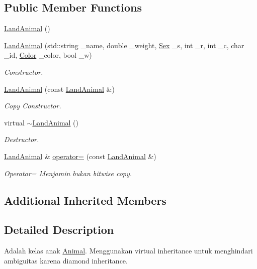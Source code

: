 \subsection*{Public Member Functions}
\begin{DoxyCompactItemize}
\item 
\hyperlink{classLandAnimal_a95def5df7e0a8fe05ba953da1a7736c1}{Land\+Animal} ()
\item 
\hyperlink{classLandAnimal_aff1be0d673a2431e45ab1130bc30411e}{Land\+Animal} (std\+::string \+\_\+name, double \+\_\+weight, \hyperlink{sex_8h_a2633cb393c68bb2ee8080db58fb7ba93}{Sex} \+\_\+s, int \+\_\+r, int \+\_\+c, char \+\_\+id, \hyperlink{color_8h_ab87bacfdad76e61b9412d7124be44c1c}{Color} \+\_\+color, bool \+\_\+w)
\begin{DoxyCompactList}\small\item\em Constructor. \end{DoxyCompactList}\item 
\hyperlink{classLandAnimal_a30d3d693ec1a1d7589a75e93c0efcef7}{Land\+Animal} (const \hyperlink{classLandAnimal}{Land\+Animal} \&)
\begin{DoxyCompactList}\small\item\em Copy Constructor. \end{DoxyCompactList}\item 
virtual \hyperlink{classLandAnimal_a074c3e48f60792ee5da0daf23feb8a13}{$\sim$\+Land\+Animal} ()
\begin{DoxyCompactList}\small\item\em Destructor. \end{DoxyCompactList}\item 
\hyperlink{classLandAnimal}{Land\+Animal} \& \hyperlink{classLandAnimal_a6ddc4597ce67878a051745cf6e14b351}{operator=} (const \hyperlink{classLandAnimal}{Land\+Animal} \&)
\begin{DoxyCompactList}\small\item\em Operator= Menjamin bukan bitwise copy. \end{DoxyCompactList}\end{DoxyCompactItemize}
\subsection*{Additional Inherited Members}


\subsection{Detailed Description}
Adalah kelas anak \hyperlink{classAnimal}{Animal}. Menggunakan virtual inheritance untuk menghindari ambiguitas karena diamond inheritance. 

